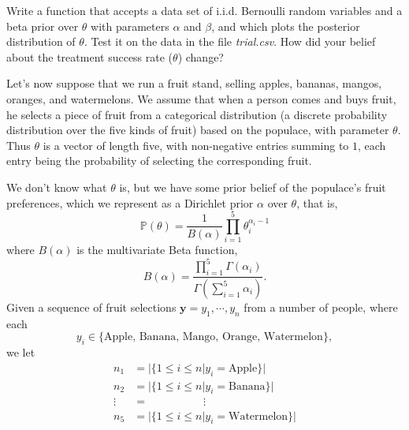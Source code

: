 \begin{problem}
Write a function that accepts a data set of i.i.d. Bernoulli random variables and a beta prior over $\theta$ with parameters $\alpha$ and $\beta$, and which plots the posterior distribution of $\theta$. Test it on the data in the file \emph{trial.csv}. How did your belief about the treatment success rate ($\theta$) change?
\end{problem}

Let's now suppose that we run a fruit stand, selling apples, bananas, mangos, oranges, and watermelons. We assume that when a person comes and buys fruit, he selects a piece of fruit from a categorical distribution (a discrete probability distribution over the five kinds of fruit) based on the populace, with parameter $\theta$. Thus $\theta$ is a vector of length five, with non-negative entries summing to $1$, each entry being the probability of selecting the corresponding fruit.

We don't know what $\theta$ is, but we have some prior belief of the populace's fruit preferences, which we represent as a Dirichlet prior $\alpha$ over $\theta$, that is, $$\mathbb{P}(\theta) = \frac{1}{B(\alpha)} \prod_{i=1}^{5} \theta_{i}^{\alpha_{i} - 1}$$ where $B(\alpha)$ is the multivariate Beta function, $$B(\alpha) = \frac{\prod_{i=1}^{5} \Gamma(\alpha_{i})}{\Gamma(\sum_{i=1}^{5} \alpha_{i})}.$$ Given a sequence of fruit selections $\mathbf{y} = y_{1}, \cdots, y_{n}$ from a number of people, where each $$y_{i} \in \{\text{Apple, Banana, Mango, Orange, Watermelon}\},$$ we let 
\begin{align*}
n_{1} & = |\{1 \leq i \leq n | y_{i} = \text{Apple}\}| \\
n_{2} & = |\{1 \leq i \leq n | y_{i} = \text{Banana}\}| \\
\vdots & = \; \; \; \; \; \; \; \; \; \; \; \; \; \; \; \; \; \; \vdots \\
n_{5} & = |\{1 \leq i \leq n | y_{i} = \text{Watermelon}\}|
\end{align*}

